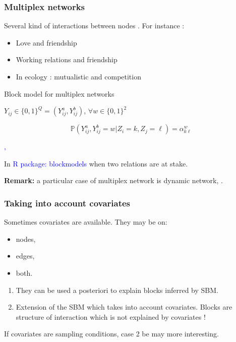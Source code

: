 \documentclass[compress,10pt]{beamer}
\begin{document}
\begin{frame} \frametitle{Multiplex networks}

Several kind of interactions between nodes . 
For instance : 


\begin{itemize}
\item Love and friendship
\item Working relations and friendship
\item  In ecology : mutualistic and competition
\end{itemize}


\begin{block}{Block model for multiplex networks}

$Y_{ij} \in \{0,1\} ^ Q = (Y_{ij}^a, Y_{ij}^b)$, $\forall w \in \{0,1\}^2$ 



$$\mathbb{P}(Y^a_{ij},Y^b_{ij} = w  | Z_i  = k, Z_j = \ell)  = \alpha^w _{k\ell}$$

\end{block}

\textcolor{blue}{
\cite{kefi}, \cite{barbillon2017stochastic}}

In \textcolor{blue}{R package: blockmodels} when two relations are at stake.
 

 \textbf{Remark:} a particular case of multiplex network is dynamic network, \textcolor{blue}{\cite{matias2017statistical}}.
 

 \end{frame}



 
\begin{frame}
 \frametitle{Taking into account covariates}
 
 Sometimes covariates are available. They may be on:
 \begin{itemize}
  \item nodes,
  \item edges,
  \item both.
 \end{itemize}

 
 
 \begin{enumerate}
  \item They can be used a posteriori to explain blocks inferred by SBM.
  \item Extension of the SBM which takes into account covariates. Blocks are structure of interaction which is not 
  explained by covariates !

 \end{enumerate}


 If covariates are sampling conditions, case 2  be  may more interesting.
 
\end{frame}
\end{document}
